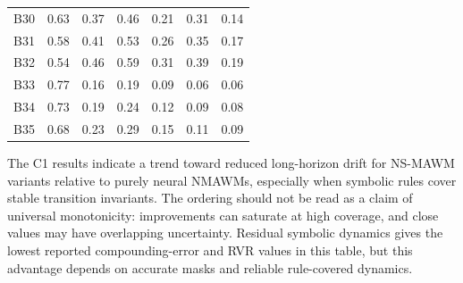 \documentclass{article}
\theoremstyle{plain}
\theoremstyle{definition}
\theoremstyle{remark}
\begin{document}
\begin{table}[h!]
{\begin{tabular}{lcccccc}
      B30                                 &
      0.63                                &
      0.37                                &
      0.46                                &
      0.21                                &
      0.31                                &
      0.14                                  \\

      B31                                 &
      0.58                                &
      0.41                                &
      0.53                                &
      0.26                                &
      0.35                                &
      0.17                                  \\

      B32                                 &
      0.54                                &
      0.46                                &
      0.59                                &
      0.31                                &
      0.39                                &
      0.19                                  \\

      B33                                 &
      0.77                                &
      0.16                                &
      0.19                                &
      0.09                                &
      0.06                                &
      0.06                                  \\

      B34                                 &
      0.73                                &
      0.19                                &
      0.24                                &
      0.12                                &
      0.09                                &
      0.08                                  \\

      B35                                 &
      0.68                                &
      0.23                                &
      0.29                                &
      0.15                                &
      0.11                                &
      0.09                                  \\

      \bottomrule
    \end{tabular}
  }
\end{table}

The C1 results indicate a trend toward reduced long-horizon drift for NS-MAWM variants relative to purely neural NMAWMs, especially when symbolic rules cover stable transition invariants. The ordering should not be read as a claim of universal monotonicity: improvements can saturate at high coverage, and close values may have overlapping uncertainty. Residual symbolic dynamics gives the lowest reported compounding-error and RVR values in this table, but this advantage depends on accurate masks and reliable rule-covered dynamics.
\end{document}

